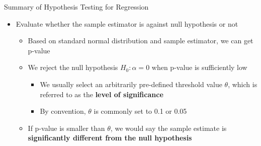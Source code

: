 \documentclass[dvipsnames,hyperref={pdfpagelabels=false}]{beamer}
\begin{document}
\begin{frame}{Summary of Hypothesis Testing for Regression}
	\begin{itemize} 
		
		
		
		\item[4.] Evaluate whether the sample estimator is against null hypothesis or not
		\begin{itemize} 
			
			\vspace{0.3cm}
			\item Based on standard normal distribution	and sample estimator, we can get p-value	
			\vspace{0.3cm}
			\item We reject the null hypothesis $H_0: \alpha=0$ when p-value is sufficiently low 	 
			\vspace{0.3cm}
			\begin{itemize} 
				\item We usually select an arbitrarily pre-defined threshold value $\theta$, which is referred to as the \textbf{level of significance}
				\vspace{0.3cm}	
				\item By convention, $\theta$ is commonly set to 0.1 or 0.05
			\end{itemize}	
			\vspace{0.3cm}	
			\item If p-value is smaller than $\theta$, we would say the sample estimate is \textbf{significantly different from the null hypothesis}
		\end{itemize}	
		
		
		
		
		
		
	\end{itemize}
\end{frame}
\end{document}
